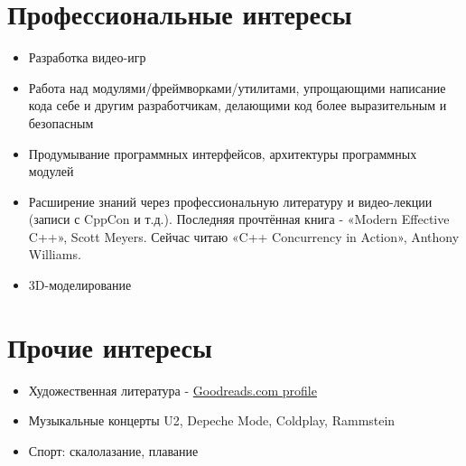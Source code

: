 \documentclass[a4paper, 11pt]{article}
\begin{document}
\section{Профессиональные интересы}
\begin{itemize}
    \item   Разработка видео-игр
    \item   Работа над модулями/фреймворками/утилитами, упрощающими написание
            кода себе и другим разработчикам, делающими код более выразительным
            и безопасным
    \item   Продумывание программных интерфейсов, архитектуры программных модулей
    \item   Расширение знаний через профессиональную литературу и видео-лекции
            (записи с CppCon и т.д.). Последняя прочтённая книга - «Modern
            Effective C++», Scott Meyers. Сейчас читаю «C++ Concurrency in
            Action», Anthony Williams.
    \item   3D-моделирование
\end{itemize}

\section{Прочие интересы}
\begin{itemize}
    \item   Художественная литература -
            \href{https://www.goodreads.com/user/show/29629010-sergey-nikitin}{Goodreads.com profile}
    \item   Музыкальные концерты U2, Depeche Mode, Coldplay, Rammstein
    \item   Спорт: скалолазание, плавание
\end{itemize}
\end{document}
